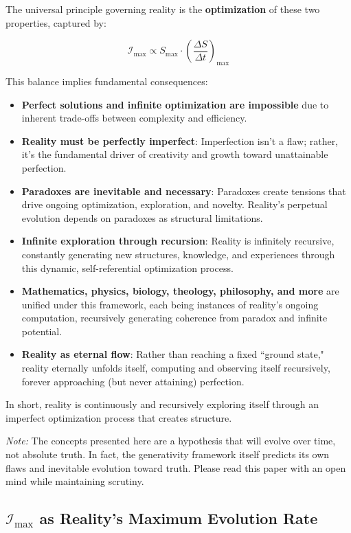 \documentclass[12pt]{article}
\begin{document}
The universal principle governing reality is the \textbf{optimization} of these two properties, captured by:

\[
\mathcal{I}_{\text{max}} \propto S_{\text{max}} \cdot \left(\frac{\Delta S}{\Delta t}\right)_{\text{max}}
\]

This balance implies fundamental consequences:

\begin{itemize}
    \item \textbf{Perfect solutions and infinite optimization are impossible} due to inherent trade-offs between complexity and efficiency.
    \item \textbf{Reality must be perfectly imperfect}: Imperfection isn't a flaw; rather, it's the fundamental driver of creativity and growth toward unattainable perfection.
    \item \textbf{Paradoxes are inevitable and necessary}: Paradoxes create tensions that drive ongoing optimization, exploration, and novelty. Reality's perpetual evolution depends on paradoxes as structural limitations.
    \item \textbf{Infinite exploration through recursion}: Reality is infinitely recursive, constantly generating new structures, knowledge, and experiences through this dynamic, self-referential optimization process.
    \item \textbf{Mathematics, physics, biology, theology, philosophy, and more} are unified under this framework, each being instances of reality’s ongoing computation, recursively generating coherence from paradox and infinite potential.
    \item \textbf{Reality as eternal flow}: Rather than reaching a fixed ``ground state," reality eternally unfolds itself, computing and observing itself recursively, forever approaching (but never attaining) perfection.
\end{itemize}

In short, reality is continuously and recursively exploring itself through an imperfect optimization process that creates structure.

\textit{Note:} The concepts presented here are a hypothesis that will evolve over time, not absolute truth. In fact, the generativity framework itself predicts its own flaws and inevitable evolution toward truth. Please read this paper with an open mind while maintaining scrutiny.

\subsection{\(\mathcal{I}_{\text{max}}\) as Reality's Maximum Evolution Rate}
\end{document}
